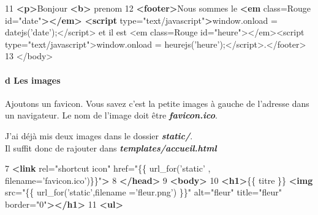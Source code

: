 \documentclass{article}
\newenvironment{Shaded}{}{}
\newcommand{\KeywordTok}[1]{\textcolor[rgb]{0.00,0.44,0.13}{\textbf{{#1}}}}
\newcommand{\DecValTok}[1]{\textcolor[rgb]{0.25,0.63,0.44}{{#1}}}
\newcommand{\StringTok}[1]{\textcolor[rgb]{0.25,0.44,0.63}{{#1}}}
\newcommand{\OtherTok}[1]{\textcolor[rgb]{0.00,0.44,0.13}{{#1}}}
\newcommand{\FunctionTok}[1]{\textcolor[rgb]{0.02,0.16,0.49}{{#1}}}
\newcommand{\NormalTok}[1]{{#1}}
\begin{document}
\begin{itemize}
\begin{Shaded}
\begin{Highlighting}[]
\NormalTok{11 }\KeywordTok{<p>}\NormalTok{Bonjour }\KeywordTok{<b>} \NormalTok{prenom}
\NormalTok{12 }\KeywordTok{<footer>}\NormalTok{Nous sommes le }\KeywordTok{<em}\OtherTok{ class=}\StringTok{Rouge}\OtherTok{ id=}\StringTok{"date"}\KeywordTok{></em>} \KeywordTok{<script}\OtherTok{ type=}\StringTok{"text/javascript"}\KeywordTok{>}\OtherTok{window}\NormalTok{.}\FunctionTok{onload} \NormalTok{= }\FunctionTok{datejs}\NormalTok{(}\StringTok{'date'}\NormalTok{);<}\OtherTok{/script> et il est <em class=Rouge id="heure"></em}\NormalTok{><script type=}\StringTok{"text/javascript"}\NormalTok{>}\OtherTok{window}\NormalTok{.}\FunctionTok{onload} \NormalTok{= }\FunctionTok{heurejs}\NormalTok{(}\StringTok{'heure'}\NormalTok{);<}\OtherTok{/script>.</footer}\NormalTok{>}
\DecValTok{13} \NormalTok{<}\OtherTok{/body>}
\end{Highlighting}
\end{Shaded}
\end{itemize}

\paragraph{d Les images}\label{d-les-images}

Ajoutons un favicon. Vous savez c'est la petite images à gauche de
l'adresse dans un navigateur. Le nom de l'image doit être
\textbf{\emph{favicon.ico}}.

J'ai déjà mis deux images dans le dossier \textbf{\emph{static/}}.\\Il
suffit donc de rajouter dans \textbf{\emph{templates/accueil.html}}

\begin{Shaded}
\begin{Highlighting}[]
 \NormalTok{7 }\KeywordTok{<link}\OtherTok{ rel=}\StringTok{"shortcut icon"}\OtherTok{ href=}\StringTok{"\{\{ url_for('static' , filename='favicon.ico')\}\}"}\KeywordTok{>}
 \NormalTok{8 }\KeywordTok{</head>}
 \NormalTok{9 }\KeywordTok{<body>}
\NormalTok{10 }\KeywordTok{<h1>}\NormalTok{\{\{ titre \}\} }\KeywordTok{<img}\OtherTok{ src=}\StringTok{"\{\{ url_for('static',filename ='fleur.png') \}\}"}\OtherTok{ alt=}\StringTok{"fleur"}\OtherTok{ title=}\StringTok{"fleur"}\OtherTok{ border=}\StringTok{"0"}\KeywordTok{></h1>}
\NormalTok{11 }\KeywordTok{<ul>}
\end{Highlighting}
\end{Shaded}
\end{document}
